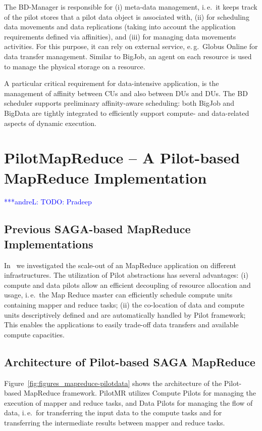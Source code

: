 \documentclass{acm_proc_article-sp}
\newcommand{\alnote}[1]{ {\textcolor{blue} { ***andreL: #1 }}}
\newcommand{\alnote}[1]{}
\begin{document}
The BD-Manager is responsible for (i) meta-data management, i.\,e.\ it
keeps track of the pilot stores that a pilot data object is associated
with, (ii) for scheduling data movements and data replications (taking
into account the application requirements defined via affinities), and
(iii) for managing data movements activities. For this purpose, it can rely
on external service, e.\,g.\ Globus Online for data transfer management.  
Similar to BigJob, an agent on each resource is used to manage the physical 
storage on a resource.  

A particular critical requirement for data-intensive application, is
the management of affinity between CUs and also between DUs and
DUs. The BD scheduler supports preliminary affinity-aware
scheduling: both BigJob and BigData are tightly integrated to
efficiently support compute- and data-related aspects of dynamic
execution.


\section{PilotMapReduce -- A Pilot-based MapReduce Implementation}
\alnote{TODO: Pradeep}


\subsection{Previous SAGA-based MapReduce Implementations}

In~\cite{Sehgal:2011:UAI:1945091.1945329} we investigated the scale-out of an 
MapReduce application on different infrastructures. The utilization of Pilot 
abstractions has several advantages: (i) compute and data pilots allow an 
efficient decoupling of resource allocation and usage, i.\,e.\ the Map Reduce 
master can efficiently schedule compute units containing mapper and reduce 
tasks; (ii) the co-location of data and compute units descriptively defined 
and are automatically handled by Pilot framework; This enables the 
applications to easily trade-off data transfers and available compute 
capacities.

\subsection{Architecture of Pilot-based SAGA MapReduce}

Figure~\ref{fig:figures_mapreduce-pilotdata} shows the architecture of the 
Pilot-based MapReduce framework. PilotMR utilizes Compute Pilots for managing the execution of mapper and reduce tasks, and Data Pilots for managing the flow of data, i.\,e.\ for transferring the input data to the compute tasks and for transferring the intermediate results between mapper and reduce tasks.
\end{document}
